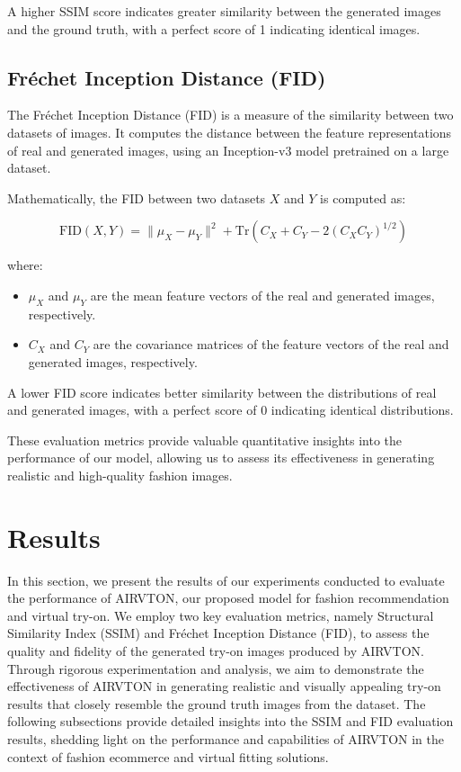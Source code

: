 A higher SSIM score indicates greater similarity between the generated images and the ground truth, with a perfect score of 1 indicating identical images.

\subsection{Fréchet Inception Distance (FID)}

The Fréchet Inception Distance (FID) is a measure of the similarity between two datasets of images. It computes the distance between the feature representations of real and generated images, using an Inception-v3 model pretrained on a large dataset.

Mathematically, the FID between two datasets \(X\) and \(Y\) is computed as:

\[
\text{FID}(X, Y) = \| \mu_X - \mu_Y \|^2 + \text{Tr}(C_X + C_Y - 2(C_XC_Y)^{1/2})
\]

where:
\begin{itemize}
  \item \(\mu_X\) and \(\mu_Y\) are the mean feature vectors of the real and generated images, respectively.
  \item \(C_X\) and \(C_Y\) are the covariance matrices of the feature vectors of the real and generated images, respectively.
\end{itemize}

A lower FID score indicates better similarity between the distributions of real and generated images, with a perfect score of 0 indicating identical distributions.

These evaluation metrics provide valuable quantitative insights into the performance of our model, allowing us to assess its effectiveness in generating realistic and high-quality fashion images.

\section{Results}

In this section, we present the results of our experiments conducted to evaluate the performance of AIRVTON, our proposed model for fashion recommendation and virtual try-on. We employ two key evaluation metrics, namely Structural Similarity Index (SSIM) and Fréchet Inception Distance (FID), to assess the quality and fidelity of the generated try-on images produced by AIRVTON. Through rigorous experimentation and analysis, we aim to demonstrate the effectiveness of AIRVTON in generating realistic and visually appealing try-on results that closely resemble the ground truth images from the dataset. The following subsections provide detailed insights into the SSIM and FID evaluation results, shedding light on the performance and capabilities of AIRVTON in the context of fashion ecommerce and virtual fitting solutions.


